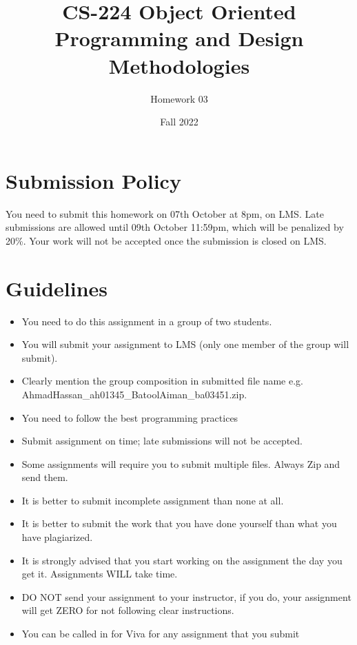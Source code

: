 \documentclass[a4paper,12pt]{article}
\begin{document}
	
	\title{CS-224 Object Oriented Programming and Design Methodologies }
	\author{Homework 03}
	\date{Fall 2022}
	\maketitle
	
	
	\section{Submission Policy}
	You need to submit this homework on  {\color{blue}07th October at 8pm}, on LMS. Late submissions are allowed until {\color{red} 09th October 11:59pm}, which will be penalized by 20\%. Your work will not be accepted once the submission is closed on LMS.
	

	\section{Guidelines}
	\begin{itemize}
		\item You need to do this assignment in a group of two students.
		\item You will submit your assignment to LMS (only one member of the group will submit).
		\item Clearly mention the group composition in submitted file name e.g. AhmadHassan\_ah01345\_BatoolAiman\_ba03451.zip. 
		\item You need to follow the best programming practices 
		\item Submit assignment on time; late submissions will not be accepted.
		\item Some assignments will require you to submit multiple files. Always Zip and send them.
		\item It is better to submit incomplete assignment than none at all.
		\item It is better to submit the work that you have done yourself than what you have plagiarized.
		\item It is strongly advised that you start working on the assignment the day you get it. Assignments WILL take time.
		\item DO NOT send your assignment to your instructor, if you do, your assignment will get ZERO for not following clear instructions.
		\item You can be called in for Viva for any assignment that you submit
	\end{itemize}
	
\end{document}
